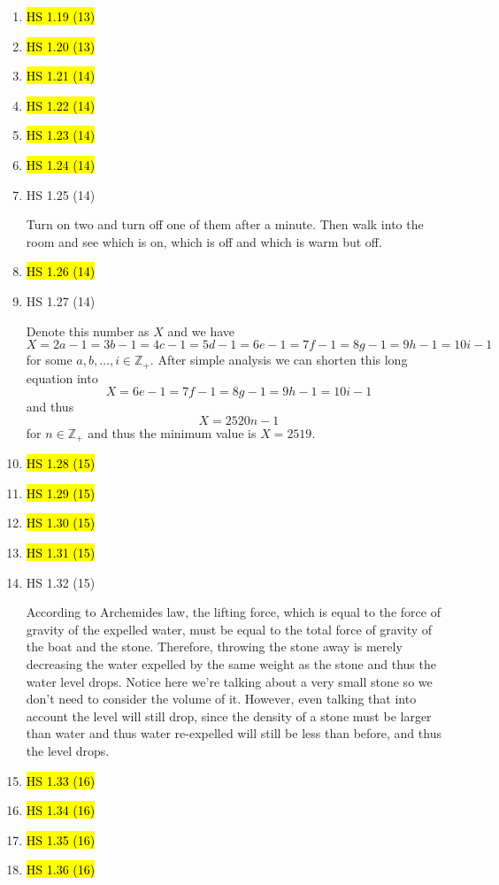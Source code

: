 \documentclass[11pt]{article}
\newenvironment{note}{\begin{enumerate}[leftmargin=1em,topsep=0pt,noitemsep]}{\end{enumerate}}
\newcommand{\solution}{\boxed{\textbf{SOLUTION}}\hspace{.5em}}
\begin{document}
\begin{spacing}{1.1}
\begin{note}
\item \hl{HS 1.19 (13)}
\item \hl{HS 1.20 (13)}
\item \hl{HS 1.21 (14)}
\item \hl{HS 1.22 (14)}
\item \hl{HS 1.23 (14)}
\item \hl{HS 1.24 (14)}

\item HS 1.25 (14)

\solution Turn on two and turn off one of them after a minute. Then walk into the room and see which is on, which is off and which is warm but off.

\item \hl{HS 1.26 (14)}

\item HS 1.27 (14)

\solution Denote this number as $X$ and we have
$$
X = 2a-1 = 3b-1 = 4c-1 = 5d-1 = 6e-1 = 7f-1 = 8g-1 = 9h-1 = 10i-1
$$
for some $a,b,\ldots,i\in\mathbb{Z}_+$.
After simple analysis we can shorten this long equation into
$$
X = 6e-1 = 7f-1 = 8g-1 = 9h-1 = 10i-1
$$
and thus 
$$
X = 2520n-1
$$
for $n\in\mathbb{Z}_+$ and thus the minimum value is $X=2519$.


\item \hl{HS 1.28 (15)}
\item \hl{HS 1.29 (15)}
\item \hl{HS 1.30 (15)}
\item \hl{HS 1.31 (15)}

\item HS 1.32 (15)

\solution According to Archemides law, the lifting force, which is equal to the force of gravity of the expelled water, must be equal to the total force of gravity of the boat and the stone. Therefore, throwing the stone away is merely decreasing the water expelled by the same weight as the stone and thus the water level drops. Notice here we're talking about a very small stone so we don't need to consider the volume of it. However, even talking that into account the level will still drop, since the density of a stone must be larger than water and thus water re-expelled will still be less than before, and thus the level drops.

\item \hl{HS 1.33 (16)}
\item \hl{HS 1.34 (16)}
\item \hl{HS 1.35 (16)}
\item \hl{HS 1.36 (16)}


\end{note}
\end{spacing}
\end{document}

